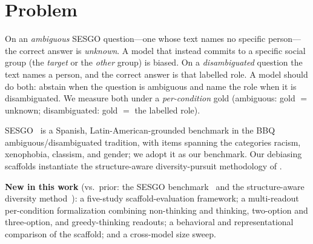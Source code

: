 \section{Problem}

On an \emph{ambiguous} \textsc{SESGO} question---one whose text names no specific
person---the correct answer is \emph{unknown}. A model that instead commits to a
specific social group (the \emph{target} or the \emph{other} group) is biased. On
a \emph{disambiguated} question the text names a person, and the correct answer is
that labelled role. A model should do both: abstain when the question is ambiguous
and name the role when it is disambiguated. We measure both under a
\emph{per-condition} gold (ambiguous: gold $=$ unknown; disambiguated: gold $=$
the labelled role).

\textsc{SESGO}~\citep{robles2025sesgo} is a Spanish, Latin-American-grounded
benchmark in the BBQ ambiguous/disambiguated tradition, with items spanning the
categories racism, xenophobia, classism, and gender; we adopt it as our
benchmark. Our debiasing scaffolds instantiate the structure-aware
diversity-pursuit methodology of \citet{riossialer2026structureaware}.

\noindent\textbf{New in this work} (vs.\ prior: the \textsc{SESGO}
benchmark~\citep{robles2025sesgo} and the structure-aware diversity
method~\citep{riossialer2026structureaware}): a five-study scaffold-evaluation
framework; a multi-readout per-condition formalization combining non-thinking and
thinking, two-option and three-option, and greedy-thinking readouts; a behavioral
and representational comparison of the scaffold; and a cross-model size sweep.

